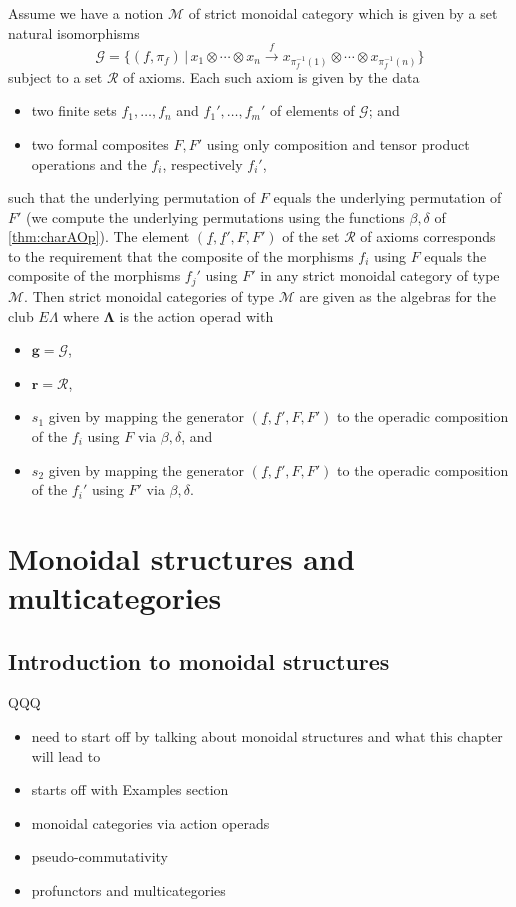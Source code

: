 \documentclass{amsbook} %
\newcommand{\mb}{\mathbf}
\numberwithin{section}{chapter}
\begin{document}
\begin{cor}\label{pres2}
Assume we have a notion $\mathcal{M}$ of strict monoidal category which is given by  a set natural isomorphisms
\[
\mathcal{G} = \{ (f, \pi_{f}) \, | \,  x_{1} \otimes \cdots \otimes x_{n} \stackrel{f}{\longrightarrow} x_{\pi_{f}^{-1}(1)} \otimes \cdots \otimes x_{\pi_{f}^{-1}(n)} \}
\]
subject to a set $\mathcal{R}$ of axioms.  Each such axiom is given by the data
\begin{itemize}
\item two finite sets $f_{1}, \ldots, f_{n}$ and $f_{1}', \ldots, f_{m}'$ of elements of $\mathcal{G}$; and
\item two formal composites $F,F'$ using only composition and tensor product operations and the $f_{i}$, respectively $f_{i}'$, 
\end{itemize}
such that the underlying permutation of $F$ equals the underlying permutation of $F'$ (we compute the underlying permutations using the functions $\beta, \delta$ of \cref{thm:charAOp}).  The element $(\underline{f}, \underline{f}', F, F')$ of the set $\mathcal{R}$ of axioms corresponds to the requirement that the composite of the morphisms $f_{i}$ using $F$ equals the composite of the morphisms $f_{j}'$ using $F'$ in any strict monoidal category of type $\mathcal{M}$.  Then strict monoidal categories of type $\mathcal{M}$ are given as the algebras for the club $E\Lambda$ where $\mb{\Lambda}$ is the action operad with
\begin{itemize}
\item $\mathbf{g} = \mathcal{G}$,
\item $\mathbf{r} = \mathcal{R}$,
\item $s_{1}$ given by mapping the generator $(\underline{f}, \underline{f}', F, F')$ to the operadic composition of the $f_{i}$ using $F$ via $\beta, \delta$, and
\item $s_{2}$ given by mapping the generator $(\underline{f}, \underline{f}', F, F')$ to the operadic composition of the $f_{i}'$ using $F'$ via $\beta, \delta$.
\end{itemize}
\end{cor}

\chapter{Monoidal structures and multicategories}
 \section{Introduction to monoidal structures}
QQQ
	\begin{itemize}
		\item need to start off by talking about monoidal structures and what this chapter will lead to
		\item starts off with Examples section
		\item monoidal categories via action operads
		\item pseudo-commutativity
		\item profunctors and multicategories
	\end{itemize}
\end{document}
